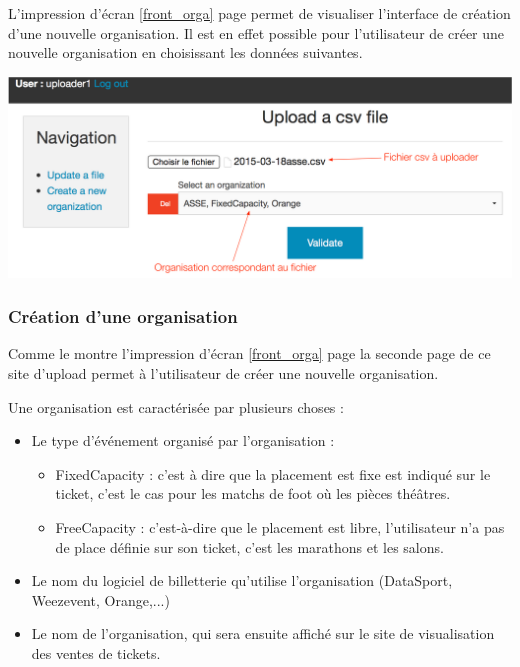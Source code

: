 L'impression d'écran \ref{front_orga} page \pageref{front_orga} permet de visualiser l'interface de création d'une nouvelle organisation. Il est en effet possible pour l'utilisateur de créer une nouvelle organisation en choisissant les données suivantes.

\begin{center}
\includegraphics[scale=0.6]{images/front1.png}
\label{front_upload}
\end{center}


\subsubsection{Création d'une organisation}

Comme le montre l'impression d'écran \ref{front_orga} page \pageref{front_orga} la seconde page de ce site d'upload permet à l'utilisateur de créer une nouvelle organisation. 

Une organisation est caractérisée par plusieurs choses : 

\begin{itemize}
	\item[\textbullet] Le type d'événement organisé par l'organisation :
	\begin{itemize}
  		\item FixedCapacity : c'est à dire que la placement est fixe est indiqué sur le ticket, c'est le cas pour les matchs de foot où les pièces théâtres.
		\item FreeCapacity : c'est-à-dire que le placement est libre, l'utilisateur n'a pas de place définie sur son ticket, c'est les marathons et les salons.
	\end{itemize}
	\item[\textbullet] Le nom du logiciel de billetterie qu'utilise l'organisation (DataSport, Weezevent, Orange,...)
	\item[\textbullet] Le nom de l'organisation, qui sera ensuite affiché sur le site de visualisation des ventes de tickets.
\end{itemize}

